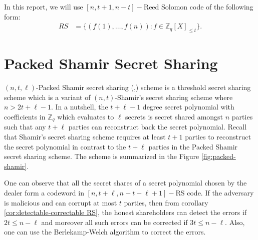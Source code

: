 In this report, we will use $[n, t+1, n-t]-$Reed Solomon code of the following form:
\begin{align}\label{eq:reed-solomon code-2}
  RS &= \{(f(1),\dots,f(n)) : f\in \mathbb{Z}_q[X]_{\leq t}\}.
\end{align}

\section{Packed Shamir Secret Sharing}
\label{sec:packed-shamir}
$(n,t,\ell)$-Packed Shamir secret sharing (\cite{10.1145/129712.129780},\cite{crypto-1984-905})
 scheme is a threshold secret sharing scheme which is a variant of $(n,t)$-Shamir's 
 secret sharing scheme \cite{10.1145/359168.359176} where $n>2t+\ell-1$. In a nutshell, the $t+\ell-1$ 
 degree secret polynomial with coefficients in $\mathbb{Z}_q$ which evaluates to $\ell$ 
 secrets is secret shared amongst $n$ parties such that any $t+\ell$ parties can 
 reconstruct back the secret polynomial. Recall that Shamir's secret sharing scheme 
 requires at least $t+1$ parties to reconstruct the secret polynomial in contrast to 
 the $t+\ell$ parties in the Packed Shamir secret sharing scheme. The scheme is
 summarized in the Figure \ref{fig:packed-shamir}.


One can observe that all the secret shares of a secret polynomial chosen by the dealer form a codeword in 
$[n,t+\ell,n-t-\ell+1]-$RS code. If the adversary is malicious and can corrupt at most $t$ parties, then from 
corollary \ref{cor:detectable-correctable RS}, the honest shareholders can detect the errors if 
$2t\leq n-\ell$ and moreover all such errors can be corrected if $3t\leq n-\ell$. Also, one can use 
the Berlekamp-Welch algorithm \cite{welch1986error} to correct the errors.\par

